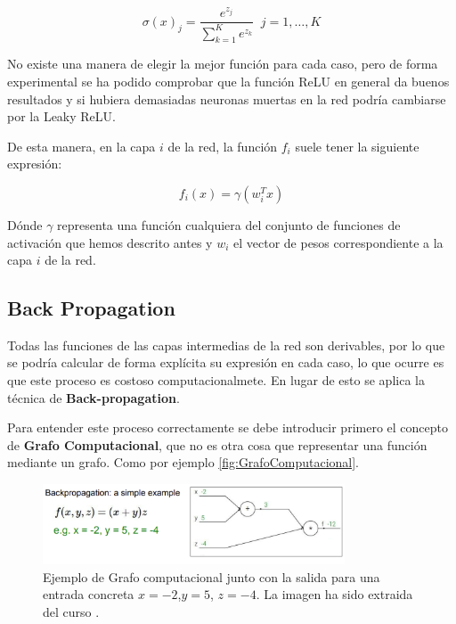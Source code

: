 \begin{itemize}
            \begin{equation}
                \sigma(x)_j= \frac{e^{z_j}}{\sum_{k=1}^{K}e^{z_k}} \; \; j=1, \ldots, K
            \end{equation}
        \end{itemize}

        \noindent No existe una manera de elegir la mejor función para cada caso, pero de forma experimental se ha podido comprobar que la función ReLU en general da buenos resultados y si hubiera demasiadas neuronas muertas en la red podría cambiarse por la Leaky ReLU.

        \medskip

        \noindent De esta manera, en la capa $i$ de la red, la función $f_i$ suele tener la siguiente expresión: 

        \begin{equation}
            f_i(x)=\gamma(w_i^T x)
        \end{equation}

        \noindent Dónde $\gamma$ representa una función cualquiera del conjunto de funciones de activación que hemos descrito antes y $w_i$ el vector de pesos correspondiente a la capa $i$ de la red.
    
    \subsection{Back Propagation}
        Todas las funciones de las capas intermedias de la red son derivables, por lo que se podría calcular de forma explícita su expresión en cada caso, lo que ocurre es que este proceso es costoso computacionalmete. En lugar de esto se aplica la técnica de \textbf{Back-propagation}.

        \medskip

        \noindent Para entender este proceso correctamente se debe introducir primero el concepto de \textbf{Grafo Computacional}, que no es otra cosa que representar una función mediante un grafo. Como por ejemplo \autoref{fig:GrafoComputacional}.

        \begin{figure}[!h]
            \centering
            \includegraphics[width=0.8\textwidth]{img/GrafoComputacional.png}
            \caption{Ejemplo de Grafo computacional junto con la salida para una entrada concreta $x=-2$,$y=5$, $z=-4$. La imagen ha sido extraida del curso \cite{StanfordCourse}.}
            \label{fig:GrafoComputacional}
        \end{figure}

